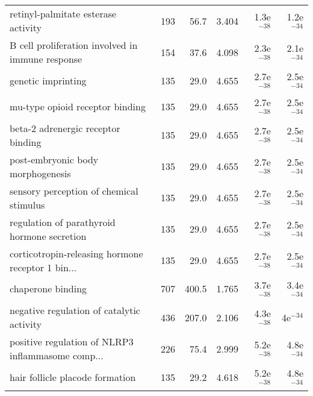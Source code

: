\begin{longtable}{lrrrrr}
               retinyl-palmitate esterase activity &                     193 &                    56.7 &      3.404 &         1.3e$^{-38}$ &         1.2e$^{-34}$ \\
  B cell proliferation involved in immune response &                     154 &                    37.6 &      4.098 &         2.3e$^{-38}$ &         2.1e$^{-34}$ \\
                                genetic imprinting &                     135 &                    29.0 &      4.655 &         2.7e$^{-38}$ &         2.5e$^{-34}$ \\
                   mu-type opioid receptor binding &                     135 &                    29.0 &      4.655 &         2.7e$^{-38}$ &         2.5e$^{-34}$ \\
                beta-2 adrenergic receptor binding &                     135 &                    29.0 &      4.655 &         2.7e$^{-38}$ &         2.5e$^{-34}$ \\
                 post-embryonic body morphogenesis &                     135 &                    29.0 &      4.655 &         2.7e$^{-38}$ &         2.5e$^{-34}$ \\
           sensory perception of chemical stimulus &                     135 &                    29.0 &      4.655 &         2.7e$^{-38}$ &         2.5e$^{-34}$ \\
       regulation of parathyroid hormone secretion &                     135 &                    29.0 &      4.655 &         2.7e$^{-38}$ &         2.5e$^{-34}$ \\
 corticotropin-releasing hormone receptor 1 bin... &                     135 &                    29.0 &      4.655 &         2.7e$^{-38}$ &         2.5e$^{-34}$ \\
                                 chaperone binding &                     707 &                   400.5 &      1.765 &         3.7e$^{-38}$ &         3.4e$^{-34}$ \\
         negative regulation of catalytic activity &                     436 &                   207.0 &      2.106 &         4.3e$^{-38}$ &           4e$^{-34}$ \\
 positive regulation of NLRP3 inflammasome comp... &                     226 &                    75.4 &      2.999 &         5.2e$^{-38}$ &         4.8e$^{-34}$ \\
                   hair follicle placode formation &                     135 &                    29.2 &      4.618 &         5.2e$^{-38}$ &         4.8e$^{-34}$ \\

\end{longtable}
